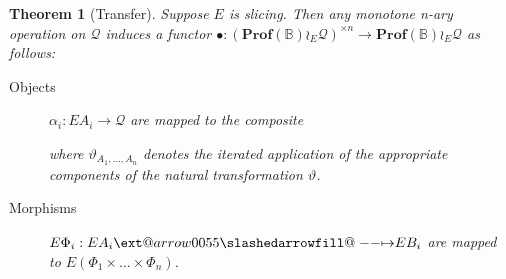 \documentclass[12pt]{article}
\makeatletter
\theoremstyle{definition}
\theoremstyle{plain}
\theoremstyle{plain}
\theoremstyle{plain}
\newtheorem{theorem}{Theorem}[section]
\theoremstyle{plain}
\theoremstyle{remark}
\theoremstyle{remark}
\newcommand{\mc}[1]{\mathcal{#1}}
\def\slashedarrowfill@#1#2#3#4#5{%
	$\m@th\thickmuskip0mu\medmuskip\thickmuskip\thinmuskip\thickmuskip
	\relax#5#1\mkern-7mu%
	\cleaders\hbox{$#5\mkern-2mu#2\mkern-2mu$}\hfill
	\mathclap{#3}\mathclap{#2}%
	\cleaders\hbox{$#5\mkern-2mu#2\mkern-2mu$}\hfill
	\mkern-7mu#4$%
}
\def\rightslashedarrowfill@{%
	\slashedarrowfill@\relbar\relbar\mapstochar\rightarrow}
\newcommand\xslashedrightarrow[2][]{%
	\ext@arrow 0055{\rightslashedarrowfill@}{#1}{#2}}
\makeatother
\begin{document}
\begin{theorem}[Transfer] \label{transfer theorem}
	Suppose $E$ is slicing. Then any monotone n-ary operation on $\mc{Q}$ induces a functor $\bullet: (\mathbf{Prof}(\mathbb{B}) \wr_E \mc{Q})^{\times n} \rightarrow \mathbf{Prof}(\mathbb{B}) \wr_E \mc{Q}$ as follows:
	\begin{description}
		\item[Objects] $\alpha_i : EA_i \rightarrow \mc{Q}$ are mapped to the composite
		\begin{center}
		\end{center}
		where $\vartheta_{A_1,\ldots,A_n}$ denotes the iterated application of the appropriate components of the natural transformation $\vartheta$.
			
		\item[Morphisms] $E\Phi_i: EA_i \xslashedrightarrow{} EB_i$ are mapped to $E(\Phi_1 \times \ldots \times \Phi_n)$.
	\end{description}
\end{theorem}
\end{document}
